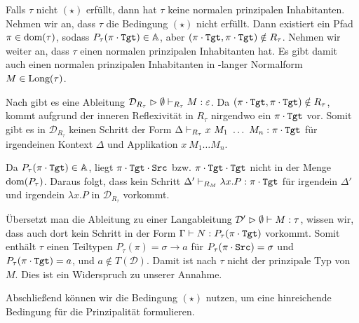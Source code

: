 \begin{lemma}{}{}
    Falls $\tau$ nicht $(\star)$ erfüllt, dann hat $\tau$ keine normalen prinzipalen Inhabitanten.
    \Proof
    Nehmen wir an, dass $\tau$ die Bedingung $(\star)$ nicht erfüllt. Dann existiert ein Pfad $\pi\in\text{dom}(\tau)$, sodass $P_\tau(\pi\cdot\texttt{Tgt})\in\mathbb{A}$, aber $(\pi\cdot\texttt{Tgt},\pi\cdot\texttt{Tgt})\notin R_\tau$. Nehmen wir weiter an, dass $\tau$ einen normalen prinzipalen Inhabitanten hat. Es gibt damit auch einen normalen prinzipalen Inhabitanten in \teta-langer Normalform $M\in \text{Long}(\tau)$. 
    
    Nach  gibt es eine Ableitung $\mathcal{D}_{R_\tau}\vartriangleright\emptyset\vdash_{R_\tau} M :\varepsilon$. Da $(\pi\cdot\texttt{Tgt},\pi\cdot\texttt{Tgt})\notin R_\tau$, kommt aufgrund der inneren Reflexivität in $R_\tau$ nirgendwo ein $\pi\cdot\texttt{Tgt}$ vor. Somit gibt es in $\mathcal{D}_{R_\tau}$ keinen Schritt der Form $\Delta\vdash_{R_\tau} x~M_1~\ldots~M_n:\pi\cdot\texttt{Tgt}$ für irgendeinen Kontext $\Delta$ und Applikation $x~M_1\ldots M_n$. 
    
    Da $P_\tau(\pi\cdot\texttt{Tgt})\in\mathbb{A}$, liegt $\pi\cdot\texttt{Tgt}\cdot\texttt{Src}$ bzw. $\pi\cdot\texttt{Tgt}\cdot\texttt{Tgt}$ nicht in der Menge $\text{dom}(P_\tau)$. Daraus folgt, dass kein Schritt $\Delta'\vdash_{R_M} \lambda x.P : \pi\cdot\texttt{Tgt}$ für irgendein $\Delta'$ und irgendein $\lambda x.P$ in $\mathcal{D}_{R_\tau}$ vorkommt. 
    
    Übersetzt man die Ableitung zu einer Langableitung $\mathcal{D}'\vartriangleright\emptyset\vdash M:\tau$, wissen wir, dass auch dort kein Schritt in der Form $\Gamma\vdash N:P_\tau(\pi\cdot\texttt{Tgt})$ vorkommt. Somit enthält $\tau$ einen Teiltypen $P_\tau(\pi) = \sigma\to a$ für $P_\tau(\pi\cdot\texttt{Src})=\sigma$ und $P_\tau(\pi\cdot\texttt{Tgt}) = a$, und $a\notin T(\mathcal{D})$. Damit ist nach  $\tau$ nicht der prinzipale Typ von $M$. Dies ist ein Widerspruch zu unserer Annahme.
\end{lemma}

Abschließend können wir die Bedingung $(\star)$ nutzen, um eine hinreichende Bedingung für die Prinzipalität formulieren.

